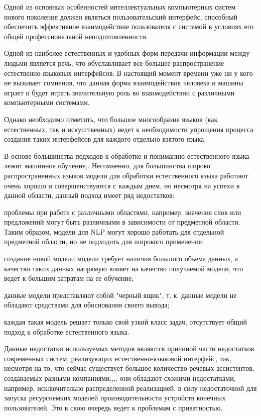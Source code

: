 Одной из основных особенностей интеллектуальных компьютерных систем нового поколения должен являться пользовательский интерфейс, способный обеспечить эффективное взаимодействие пользователя с системой в условиях его общей профессиональной неподготовленности.

Одной из наиболее естественных и удобных форм передачи информации между людьми является речь, что обуславливает все большее распространение естественно-языковых интерфейсов. В настоящий момент времени уже ни у кого не вызывает сомнения, что данная форма взаимодействия человека и машины играет и будет играть значительную роль во взаимодействии с различными компьютерными системами.

Однако необходимо отметить, что большое многообразие языков (как естественных, так и искусственных) ведет к необходимости упрощения процесса создания таких интерфейсов для каждого отдельно взятого языка.

В основе большинства подходов к обработке и пониманию естественного языка лежит машинное обучение,. Несомненно, для большинства широко распространенных языков модели для обработки естественного языка работают очень хорошо и совершенствуются с каждым днем, но несмотря на успехи в данной области, данный подход имеет ряд недостатков:
\begin{textitemize}
    \item проблемы при работе с различными областями, например, значения слов или предложений могут быть различными в зависимости от предметной области. Таким образом, модели для NLP могут хорошо работать для отдельной предметной области, но не подходить для широкого применения;
    \item создание новой модели модели требует наличия большого объема данных, а качество таких данных напрямую влияет на качество получаемой модели, что ведет к большим затратам на ее обучение;
    \item данные модели представляют собой "черный ящик"{}, т. к. данные модели не обладают средствами для обоснования своего вывода;
    \item каждая такая модель решает только свой узкий класс задач, отсутствует общий подход к обработке естественного языка.
\end{textitemize}

Данные недостатки используемых методов являются причиной части недостатков современных систем, реализующих естественно-языковой интерфейс, так, несмотря на то, что сейчас существует большое количество речевых ассистентов, создаваемых разными компаниями,,,, они обладают схожими недостатками, например, исключительно распределенной реализацией, в силу недостаточной для запуска ресурсоемких моделей производительности устройств конечных пользователей. Это в свою очередь ведет к проблемам с приватностью.

